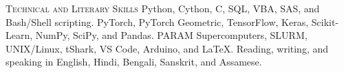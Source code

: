 
\begin{rubric}{\textsc{Technical and Literary Skills}}
	Python, Cython, C, SQL, VBA, SAS, and Bash/Shell scripting.
\entry*[AI/ML Frameworks]
	PyTorch, PyTorch Geometric, TensorFlow, Keras, Scikit-Learn, NumPy, SciPy, and Pandas.
	PARAM Supercomputers, SLURM, UNIX/Linux, tShark, VS Code, Arduino, and LaTeX.
\entry*[Communication]
	Reading, writing, and speaking in English, Hindi, Bengali, Sanskrit, and Assamese.
\end{rubric}
